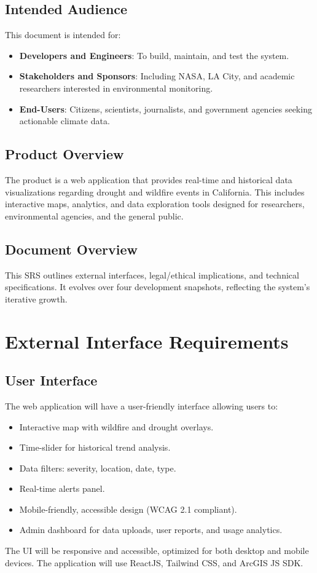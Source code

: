 \documentclass[12pt]{article}
\begin{document}
\subsection{Intended Audience}
This document is intended for:
\begin{itemize}
\item \textbf{Developers and Engineers}: To build, maintain, and test the system.
\item \textbf{Stakeholders and Sponsors}: Including NASA, LA City, and academic researchers interested in environmental monitoring.
\item \textbf{End-Users}: Citizens, scientists, journalists, and government agencies seeking actionable climate data.
\end{itemize}

\subsection{Product Overview}
The product is a web application that provides real-time and historical data visualizations regarding drought and wildfire events in California. This includes interactive maps, analytics, and data exploration tools designed for researchers, environmental agencies, and the general public.

\subsection{Document Overview}
This SRS outlines external interfaces, legal/ethical implications, and technical specifications. It evolves over four development snapshots, reflecting the system's iterative growth.
\newpage
\section{External Interface Requirements}
\subsection{User Interface}
The web application will have a user-friendly interface allowing users to:
\begin{itemize}
\item Interactive map with wildfire and drought overlays.
\item Time-slider for historical trend analysis.
\item Data filters: severity, location, date, type.
\item Real-time alerts panel.
\item Mobile-friendly, accessible design (WCAG 2.1 compliant).
\item Admin dashboard for data uploads, user reports, and usage analytics.
\end{itemize}
The UI will be responsive and accessible, optimized for both desktop and mobile devices. The application will use  ReactJS, Tailwind CSS, and ArcGIS JS SDK.
\end{document}
